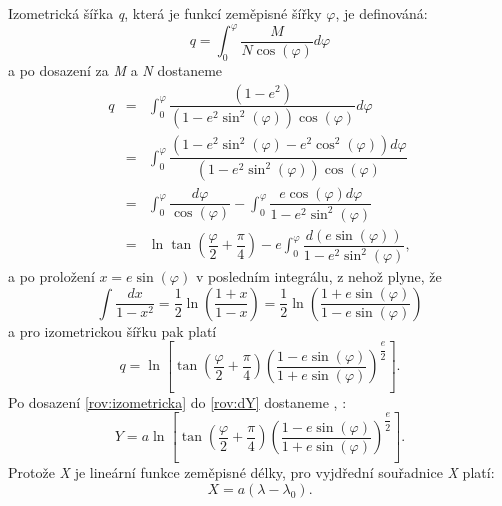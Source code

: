 \documentclass[11pt,a4paper]{article}
\begin{document}
Izometrická šířka \textit{q}, která je funkcí zeměpisné šířky $\varphi$, je definováná:
\begin{equation}
q = \int_{0}^{\varphi}\dfrac{M}{N\cos{\left(\varphi\right)}}d\varphi
\end{equation}
a po dosazení za \textit{M} a \textit{N} dostaneme
\begin{eqnarray}
q &=& \int_{0}^{\varphi} \dfrac{\left(1-e^{2}\right)}{\left(1-e^{2}\sin^{2}{\left(\varphi\right)}\right)\cos{\left(\varphi\right)}}d\varphi \\ \nonumber
  &=&\int_{0}^{\varphi}\dfrac{\left(1-e^{2}\sin^{2}{\left(\varphi\right)}-e^{2}\cos^{2}{\left(\varphi\right)}\right)d\varphi}{\left(1-e^{2}\sin^{2}{\left(\varphi\right)}\right)\cos{\left(\varphi\right)}} \\ \nonumber
  &=& \int_{0}^{\varphi}\dfrac{d\varphi}{\cos{\left(\varphi\right)}} - \int_{0}^{\varphi}\dfrac{e\cos{\left(\varphi\right)}d\varphi}{1-e^{2}\sin^{2}{\left(\varphi\right)}} \\ \nonumber
  &=& \ln\tan{\left(\dfrac{\varphi}{2} + \dfrac{\pi}{4}\right)} - e\int_{0}^{\varphi}\dfrac{d\left(e\sin{\left(\varphi\right)}\right)}{1-e^{2}\sin^{2}{\left(\varphi\right)}},
\end{eqnarray}
a po proložení $x = e\sin{\left(\varphi\right)}$ v posledním integrálu, z nehož plyne, že 
\begin{equation}
\int \dfrac{dx}{1-x^{2}} = \dfrac{1}{2}\ln{\left(\dfrac{1+x}{1-x}\right)} = \dfrac{1}{2}\ln{\left(\dfrac{1+e\sin{\left(\varphi\right)}}{1-e\sin{\left(\varphi\right)}}\right)}
\end{equation}
a pro izometrickou šířku pak platí
\begin{equation}
q = \ln{\left[\tan{\left(\dfrac{\varphi}{2}+\dfrac{\pi}{4}\right)}\left( \dfrac{1-e\sin{\left(\varphi\right)}}{1+e\sin{\left(\varphi\right)}} \right)^{\dfrac{e}{2}}\right]}.
\label{rov:izometricka}
\end{equation}
Po dosazení \ref{rov:izometricka} do \ref{rov:dY} dostaneme \cite{Buchar2002}, \cite{Snyder1987}:
\begin{equation}
Y = a\ln{\left[\tan{\left(\dfrac{\varphi}{2}+\dfrac{\pi}{4}\right)}\left( \dfrac{1-e\sin{\left(\varphi\right)}}{1+e\sin{\left(\varphi\right)}} \right)^{\dfrac{e}{2}}\right]}.
\label{rov:utmY}
\end{equation}
Protože \textit{X} je lineární funkce zeměpisné délky, pro vyjdřední souřadnice \textit{X} platí:
\begin{equation}
X = a\left(\lambda-\lambda_{0}\right).
\end{equation}
\end{document}
